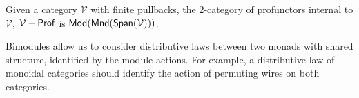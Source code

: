 \documentclass[12pt]{ociamthesis}  %
\newcommand{\Mnd}{{\sf Mnd}}
\begin{document}
\begin{definition}
\end{definition}


\begin{definition}
\end{definition}

\begin{definition}
\end{definition}


\begin{definition}
\end{definition}


\begin{definition}
\end{definition}



\begin{definition}
Given a category $\mathcal V$ with finite pullbacks, the 2-category of profunctors internal to $\mathcal V$, $\mathcal{V}-{\sf Prof}$ is $\Mod(\Mnd(\Span(\mathcal{V})))$.
\end{definition}

Bimodules allow us to consider distributive laws between two monads with shared structure, identified by the module actions.  For example, a distributive law of monoidal categories should identify the action of permuting wires on both categories. 



\begin{definition}
\end{definition}


\begin{definition}
\end{definition}


\begin{definition}
\end{definition}

\begin{lemma}
\end{lemma}


\begin{definition}
\end{definition}
\end{document}
